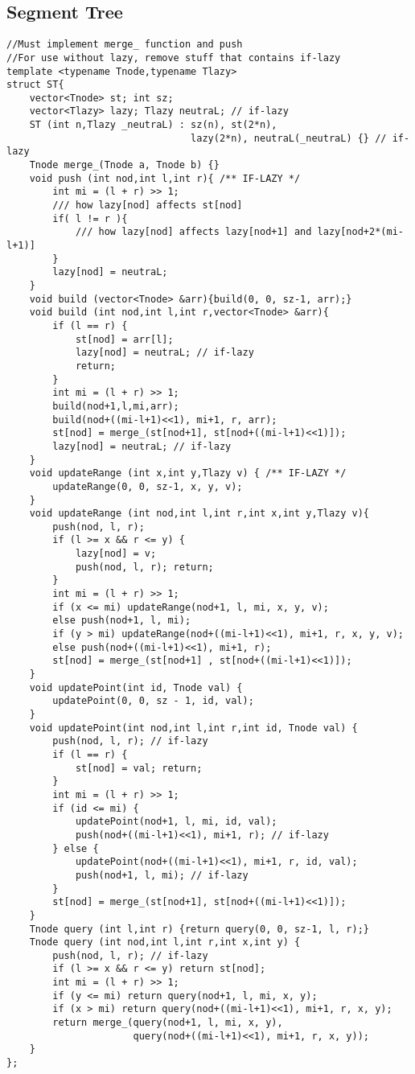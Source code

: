 \documentclass[landscape, 8pt, a4paper, oneside]{extarticle}
\begin{document}
\begin{multicols}{3}
\subsection{Segment Tree}
\begin{verbatim}
//Must implement merge_ function and push
//For use without lazy, remove stuff that contains if-lazy
template <typename Tnode,typename Tlazy>
struct ST{
    vector<Tnode> st; int sz;
    vector<Tlazy> lazy; Tlazy neutraL; // if-lazy
    ST (int n,Tlazy _neutraL) : sz(n), st(2*n),
                                lazy(2*n), neutraL(_neutraL) {} // if-lazy
    Tnode merge_(Tnode a, Tnode b) {}
    void push (int nod,int l,int r){ /** IF-LAZY */
        int mi = (l + r) >> 1;
        /// how lazy[nod] affects st[nod]
        if( l != r ){
            /// how lazy[nod] affects lazy[nod+1] and lazy[nod+2*(mi-l+1)]
        }
        lazy[nod] = neutraL;
    }
    void build (vector<Tnode> &arr){build(0, 0, sz-1, arr);}
    void build (int nod,int l,int r,vector<Tnode> &arr){
        if (l == r) {
            st[nod] = arr[l];
            lazy[nod] = neutraL; // if-lazy
            return;
        }
        int mi = (l + r) >> 1;
        build(nod+1,l,mi,arr);
        build(nod+((mi-l+1)<<1), mi+1, r, arr);
        st[nod] = merge_(st[nod+1], st[nod+((mi-l+1)<<1)]);
        lazy[nod] = neutraL; // if-lazy
    }
    void updateRange (int x,int y,Tlazy v) { /** IF-LAZY */
        updateRange(0, 0, sz-1, x, y, v);
    }
    void updateRange (int nod,int l,int r,int x,int y,Tlazy v){
        push(nod, l, r);
        if (l >= x && r <= y) {
            lazy[nod] = v;
            push(nod, l, r); return;
        }
        int mi = (l + r) >> 1;
        if (x <= mi) updateRange(nod+1, l, mi, x, y, v);
        else push(nod+1, l, mi);
        if (y > mi) updateRange(nod+((mi-l+1)<<1), mi+1, r, x, y, v);
        else push(nod+((mi-l+1)<<1), mi+1, r);
        st[nod] = merge_(st[nod+1] , st[nod+((mi-l+1)<<1)]);
    }
    void updatePoint(int id, Tnode val) {
        updatePoint(0, 0, sz - 1, id, val);
    }
    void updatePoint(int nod,int l,int r,int id, Tnode val) {
        push(nod, l, r); // if-lazy
        if (l == r) {
            st[nod] = val; return;
        }
        int mi = (l + r) >> 1;
        if (id <= mi) {
            updatePoint(nod+1, l, mi, id, val);
            push(nod+((mi-l+1)<<1), mi+1, r); // if-lazy
        } else {
            updatePoint(nod+((mi-l+1)<<1), mi+1, r, id, val);
            push(nod+1, l, mi); // if-lazy
        }
        st[nod] = merge_(st[nod+1], st[nod+((mi-l+1)<<1)]);
    }
    Tnode query (int l,int r) {return query(0, 0, sz-1, l, r);}
    Tnode query (int nod,int l,int r,int x,int y) {
        push(nod, l, r); // if-lazy
        if (l >= x && r <= y) return st[nod];
        int mi = (l + r) >> 1;
        if (y <= mi) return query(nod+1, l, mi, x, y);
        if (x > mi) return query(nod+((mi-l+1)<<1), mi+1, r, x, y);
        return merge_(query(nod+1, l, mi, x, y),
                      query(nod+((mi-l+1)<<1), mi+1, r, x, y));
    }
};
\end{verbatim}

\end{multicols}
\end{document}
